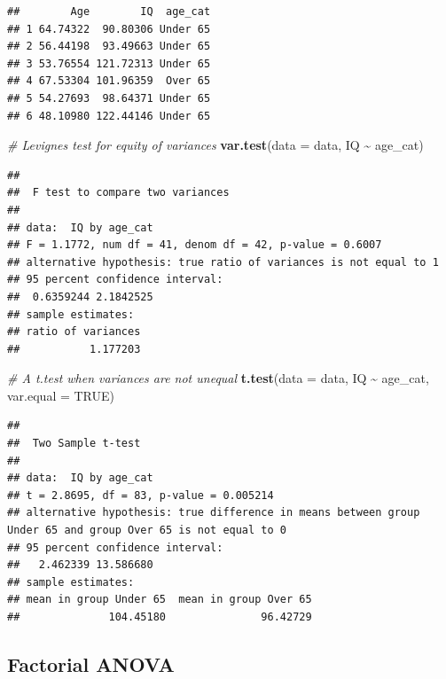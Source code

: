 \documentclass[
]{book}
\newenvironment{Shaded}{\begin{snugshade}}{\end{snugshade}}
\newcommand{\AttributeTok}[1]{\textcolor[rgb]{0.13,0.29,0.53}{#1}}
\newcommand{\CommentTok}[1]{\textcolor[rgb]{0.56,0.35,0.01}{\textit{#1}}}
\newcommand{\ConstantTok}[1]{\textcolor[rgb]{0.56,0.35,0.01}{#1}}
\newcommand{\FunctionTok}[1]{\textcolor[rgb]{0.13,0.29,0.53}{\textbf{#1}}}
\newcommand{\NormalTok}[1]{#1}
\newcommand{\SpecialCharTok}[1]{\textcolor[rgb]{0.81,0.36,0.00}{\textbf{#1}}}
\begin{document}
\begin{verbatim}
##        Age        IQ  age_cat
## 1 64.74322  90.80306 Under 65
## 2 56.44198  93.49663 Under 65
## 3 53.76554 121.72313 Under 65
## 4 67.53304 101.96359  Over 65
## 5 54.27693  98.64371 Under 65
## 6 48.10980 122.44146 Under 65
\end{verbatim}

\begin{Shaded}
\begin{Highlighting}[]
\CommentTok{\# Levigne\textquotesingle{}s test for equity of variances}
\FunctionTok{var.test}\NormalTok{(}\AttributeTok{data =}\NormalTok{ data, IQ }\SpecialCharTok{\textasciitilde{}}\NormalTok{ age\_cat)}
\end{Highlighting}
\end{Shaded}

\begin{verbatim}
## 
##  F test to compare two variances
## 
## data:  IQ by age_cat
## F = 1.1772, num df = 41, denom df = 42, p-value = 0.6007
## alternative hypothesis: true ratio of variances is not equal to 1
## 95 percent confidence interval:
##  0.6359244 2.1842525
## sample estimates:
## ratio of variances 
##           1.177203
\end{verbatim}

\begin{Shaded}
\begin{Highlighting}[]
\CommentTok{\# A t.test when variances are not unequal}
\FunctionTok{t.test}\NormalTok{(}\AttributeTok{data =}\NormalTok{ data, IQ }\SpecialCharTok{\textasciitilde{}}\NormalTok{ age\_cat, }\AttributeTok{var.equal =} \ConstantTok{TRUE}\NormalTok{)}
\end{Highlighting}
\end{Shaded}

\begin{verbatim}
## 
##  Two Sample t-test
## 
## data:  IQ by age_cat
## t = 2.8695, df = 83, p-value = 0.005214
## alternative hypothesis: true difference in means between group Under 65 and group Over 65 is not equal to 0
## 95 percent confidence interval:
##   2.462339 13.586680
## sample estimates:
## mean in group Under 65  mean in group Over 65 
##              104.45180               96.42729
\end{verbatim}

\subsection*{Factorial ANOVA}\label{factorial-anova}
\end{document}
